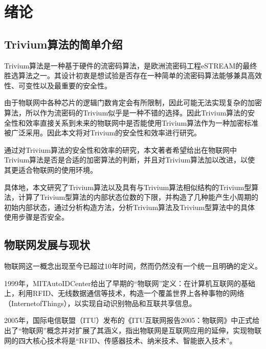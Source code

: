 
\chapter{绪论}
\label{chap:introduction}

\section{Trivium算法的简单介绍}

Trivium算法是一种基于硬件的流密码算法，是欧洲流密码工程eSTREAM的最终胜选算法之一。其设计初衷是想试验是否存在一种简单的流密码算法能够兼具高效性、可变性以及最重要的安全性。

由于物联网中各种芯片的逻辑门数肯定会有所限制，因此可能无法实现复杂的加密算法，所以作为流密码的Trivium似乎是一种不错的选择。因此Trivium算法的安全性和效率直接关系到未来的物联网中是否能使用Trivium算法作为一种加密标准被广泛采用。因此本文将对Trivium的安全性和效率进行研究。

通过对Trivium算法的安全性和效率的研究，本文著者希望给出在物联网中Trivium算法是否是合适的加密算法的判断，并且对Trivium算法加以改进，以使其更适合物联网的使用环境。

具体地，本文研究了Trivium算法以及具有与Trivium算法相似结构的Trivium型算法，计算了Trivium型算法的内部状态位数的下限，并构造了几种能产生小周期的初始内部状态，通过分析构造方法，分析Trivium算法及Trivium型算法中的具体使用步骤是否安全。


\section{物联网发展与现状}

物联网这一概念出现至今已超过10年时间，然而仍然没有一个统一且明确的定义。

1999年，MITAutoIDCenter给出了早期的“物联网”定义：在计算机互联网的基础上，利用RFID、无线数据通信等技术，构造一个覆盖世界上各种事物的网络（InternetofThings），以实现自动识别物品和互联共享信息\parencite{宁焕生2010全球物联网发展及中国物联网建设若干思考}。

2005年，国际电信联盟（ITU）发布的《ITU互联网报告2005：物联网》中正式给出了“物联网”概念并对扩展了其涵义，指出物联网是互联网应用的延伸，实现物联网的四大核心技术将是“RFID、传感器技术、纳米技术、智能嵌入技术”\parencite{宁焕生2010全球物联网发展及中国物联网建设若干思考}。

